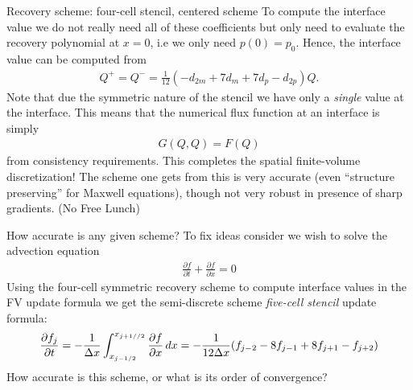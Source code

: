 \documentclass[aspectratio=169]{beamer}
\newcommand{\mypause}{}
\newcommand{\pfrac}[2]{\frac{\partial #1}{\partial #2}}
\begin{document}
\begin{frame}{Recovery scheme: four-cell stencil, centered scheme}
  \small%
  To compute the interface value we do not really need all of these
  coefficients but only need to evaluate the recovery polynomial at
  $x=0$, i.e we only need $p(0) = p_0$. Hence, the interface value can
  be computed from
  \begin{align*}
    Q^+ = Q^- = \frac{1}{12}(-d_{2m} + 7 d_m + 7 d_p - d_{2p}) Q.
  \end{align*}
  Note that due the symmetric nature of the stencil we have only a
  \emph{single} value at the interface. This means that the numerical
  flux function at an interface is simply
  \begin{align*}
    G(Q,Q) = F(Q)
  \end{align*}
  from consistency requirements.%
  \mypause%
  This completes the spatial finite-volume discretization! The scheme
  one gets from this is very accurate (even ``structure preserving''
  for Maxwell equations), though not very robust in presence of sharp
  gradients. (No Free Lunch)
\end{frame}

\begin{frame}{How accurate is any given scheme?}
  To fix ideas consider we wish to solve the advection equation
  \begin{align*}
    \pfrac{f}{t} + \pfrac{f}{x} = 0
  \end{align*}
  Using the four-cell symmetric recovery scheme to compute interface
  values in the FV update formula we get the semi-discrete scheme
  \emph{five-cell stencil} update formula:
  \begin{align*}
    \pfrac{f_j}{t}
    = -\frac{1}{\Delta x}\int_{x_{j-1/2}}^{x_{j+1//2}}
    \pfrac{f}{x} \thinspace dx
    =
    -\frac{1}{12 \Delta x} (f_{j-2} - 8f_{j-1} + 8 f_{j+1} - f_{j+2})
  \end{align*}
  How accurate is this scheme, or what is its order of convergence?
\end{frame}
\end{document}
